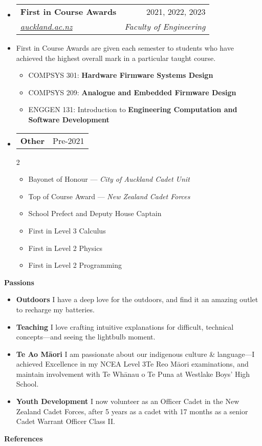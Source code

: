 \documentclass[11pt,a4paper]{article}[leftmargin=*]
\makeatletter
\def \entryspacing {-0pt}
\def \bulletstylei {\faAngleRight\hspace{-4.5pt}}
\renewcommand{\section}[2]{\vspace{5pt}
  \colorbox{secondary}{\color{white}\raggedbottom\normalsize\textbf{{#1}{\hspace{2pt}#2\hspace{4pt}}}}
}
\newcommand{\resumeEntryStart}{\begin{itemize}[leftmargin=2.5mm]}
\newcommand{\resumeEntryEnd}{\end{itemize}\vspace{\entryspacing}}
\newcommand{\resumeItemListStart}{\begin{itemize}[leftmargin=4.5mm]}
\newcommand{\resumeItemListEnd}{\end{itemize}}
\newcommand{\resumeItemListStartColumns}[2][-0.5]{\vspace*{#1\multicolsep}
\begin{multicols}{#2}\begin{itemize}[leftmargin=4.5mm]}
\newcommand{\resumeItemListEndColumns}[1][-1]{\end{itemize}\end{multicols}\vspace*{#1\multicolsep}}
\newcommand{\resumeItem}[2][\bulletstylei]{
  \item[\small#1]\small{
    {#2 \vspace{-2pt}}
  }
}
\newcommand{\resumeEntryTSDL}[4]{
  \vspace{-1pt}\item[]
    \begin{tabularx}{0.97\textwidth}{X@{\hspace{60pt}}r}
      \textbf{\color{primary}#1} & {\firabook\color{accent}\small#2} \\
      \textit{\color{accent}\small#3} & \textit{\color{accent}\small#4} \\
    \end{tabularx}\vspace{-6pt}
}
\newcommand{\resumeEntryTD}[2]{
  \vspace{-1pt}\item[]
    \begin{tabularx}{0.97\textwidth}{X@{\hspace{60pt}}r}
      \textbf{\color{primary}#1} & {\firabook\color{accent}\small#2} \\
    \end{tabularx}\vspace{-6pt}
}
\newcommand{\resumeEntryS}[2]{
  \item[]\small{
    \textbf{\color{primary}#1 }{ #2 \vspace{-4pt}}
  }
}
\newcommand{\resumeEntryP}[1]{
  \item[]\small{
    #1 \vspace{-4pt}
  }\\
}
\newcommand{\resumeIt}[1]{\textit{\color{accent}#1}}
\newcommand{\resumeBf}[1]{\small\textbf{\color{halfbold}#1}}
\makeatother
\begin{document}
\resumeEntryStart
\resumeEntryTSDL
{First in Course Awards}{2021, 2022, 2023}
{\href{https://www.auckland.ac.nz/assets/study/scholarships-and-funding/find-a-scholarship-or-award/regulations/first-in-course-award.pdf}{auckland.ac.nz}}{Faculty of Engineering}
\resumeEntryP {First in Course Awards are given each semester to students who have achieved the highest overall mark in a particular taught course.}
\resumeItemListStart
\resumeItem {COMPSYS 301: \resumeBf{Hardware Firmware Systems Design}}
\resumeItem {COMPSYS 209: \resumeBf{Analogue and Embedded Firmware Design}}
\resumeItem {ENGGEN 131: Introduction to \resumeBf{Engineering Computation and Software Development}}
\resumeItemListEnd
\resumeEntryEnd

\resumeEntryStart
\resumeEntryTD
{Other}{Pre-2021}
\resumeItemListStartColumns{2}
\resumeItem {Bayonet of Honour --- \resumeIt{City of Auckland Cadet Unit}}
\resumeItem {Top of Course Award --- \resumeIt{New Zealand Cadet Forces}}
\resumeItem {School Prefect and Deputy House Captain}
\resumeItem {First in Level 3 Calculus}
\resumeItem {First in Level 2 Physics}
\resumeItem {First in Level 2 Programming}
\resumeItemListEndColumns
\resumeEntryEnd


\section{\faUserCircle}{Passions}

\resumeEntryStart
\resumeEntryS
{Outdoors}
{
  I have a deep love for the outdoors, and find it an amazing outlet to recharge my batteries.
}

\resumeEntryS
{Teaching}
{
  I love crafting intuitive explanations for difficult, technical concepts---and seeing the lightbulb moment.
}

\resumeEntryS
{Te Ao Māori}
{
  I am passionate about our indigenous culture \& language---I achieved Excellence in my NCEA Level 3\break Te Reo Māori examinations, and maintain involvement with Te Whānau o Te Puna at Westlake Boys' High School.
}

\resumeEntryS
{Youth Development}
{
  I now volunteer as an Officer Cadet in the New Zealand Cadet Forces, after 5 years as a cadet with 17 months as a senior Cadet Warrant Officer Class II.
}
\resumeEntryEnd


\section{\faUserCheck}{References}
\end{document}
